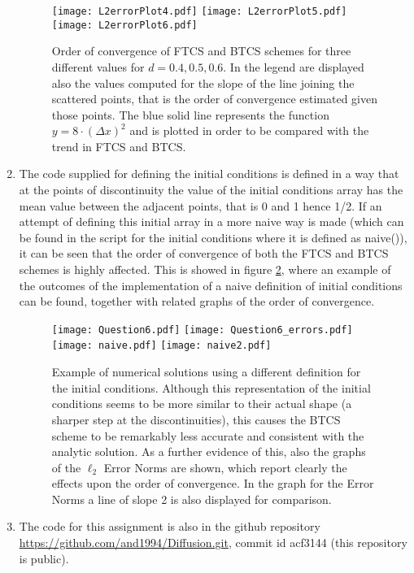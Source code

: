 \documentclass[12pt]{article}
\begin{document}
\begin{enumerate}
\begin{figure}[!tbh]
\centering
\texttt{[image: L2errorPlot4.pdf]}
\texttt{[image: L2errorPlot5.pdf]}
\texttt{[image: L2errorPlot6.pdf]}

\caption{Order of convergence of FTCS and BTCS schemes for three different values for $d=0.4, 0.5, 0.6$. In the legend are displayed also the values computed for the slope of the line joining the scattered points, that is the order of convergence estimated given those points. The blue solid line represents the function $y=8\cdot(\Delta x)^2$ and is plotted in order to be compared with the trend in FTCS and BTCS.
\label{fig:Q5}}
\end{figure}

\item The code supplied for defining the initial conditions is defined in a way that at the points of discontinuity the value of the initial conditions array has the mean value between the adjacent points, that is 0 and 1 hence 1/2. If an attempt of defining this initial array in a more naive way is made (which can be found in the script for the initial conditions where it is defined as naive()), it can be seen that the order of convergence of both the FTCS and BTCS schemes is highly affected. This is showed in figure \ref{fig:Q6}, where an example of the outcomes of the implementation of a naive definition of initial conditions can be found, together with related graphs of the order of convergence.

\begin{figure}[!tbh]
\centering
\texttt{[image: Question6.pdf]}
\texttt{[image: Question6\_errors.pdf]}
\texttt{[image: naive.pdf]}
\texttt{[image: naive2.pdf]}

\caption{Example of numerical solutions using a different definition for the initial conditions. Although this representation of the initial conditions seems to be more similar to their actual shape (a sharper step at the discontinuities), this causes the BTCS scheme to be remarkably less accurate and consistent with the analytic solution. As a further evidence of this, also the graphs of the $\ell_2$ Error Norms are shown, which report clearly the effects upon the order of convergence. In the graph for the Error Norms a line of slope 2 is also displayed for comparison.}
\label{fig:Q6}
\end{figure}

\item The code for this assignment is also in the github repository\\
\url{https://github.com/and1994/Diffusion.git}, commit id acf3144 (this repository is public).


\end{enumerate}
\end{document}
